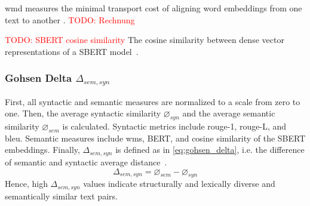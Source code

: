 \ac{wmd} measures the minimal transport cost of aligning word embeddings from one text to another \citep{gohsen_captions_2023}. 
\textcolor{red}{TODO: Rechnung}

\textcolor{red}{TODO: SBERT cosine similarity}
The cosine similarity between dense vector representations of a SBERT model~\citep{gohsen_captions_2023}.

\subsubsection{Gohsen Delta $\Delta_{sem,syn}$}
First, all syntactic and semantic measures are normalized to a scale from zero to one.
Then, the average syntactic similarity $\diameter_{syn}$ and the average semantic similarity $\diameter_{sem}$ is calculated.
Syntactic metrics include \ac{rouge}-1, \ac{rouge}-L, and \ac{bleu}.
Semantic measures include \ac{wms}, BERT, and cosine similarity of the SBERT embeddings.
Finally, $\Delta_{sem,syn}$ is defined as in \autoref{eq:gohsen_delta}, i.e. the difference of semantic and syntactic average distance~\citep{gohsen_captions_2023}.
\begin{equation}
    \Delta_{sem,syn}=\diameter_{sem}-\diameter_{syn}
    \label{eq:gohsen_delta}
\end{equation}
Hence, high $\Delta_{sem,syn}$ values indicate structurally and lexically diverse and semantically similar text pairs.
